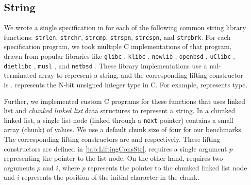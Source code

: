 

\subsection{String}
\label{sec:expstring}
We wrote a single specification in \SpecL{} for each of the following
common string library functions: {\tt strlen}, {\tt strchr}, {\tt strcmp}, {\tt strspn},
{\tt strcspn}, and {\tt strpbrk}.  For each specification
program, we took multiple C implementations of that program, drawn from popular
libraries like {\tt glibc} \cite{glibc}, {\tt klibc} \cite{klibc}, {\tt newlib} \cite{newlib},
{\tt openbsd} \cite{openbsdlibc}, {\tt uClibc} \cite{uclibc},
{\tt dietlibc} \cite{dietlibc}, {\tt musl} \cite{musl}, and {\tt netbsd} \cite{netbsd}.
These library implementations use a nul-terminated array to represent
a string, and the corresponding lifting constructor is .
 represents the N-bit unsigned integer type in C.
For example,  represents  type.

Further, we implemented custom C programs for these functions that uses linked list
and {\em chunked linked list} data structures to represent a string.
In a chunked linked list, a single list node (linked through a {\tt next} pointer)
contains a small array (chunk) of values.
We use a default chunk size of four for our benchmarks.
The corresponding lifting constructors are 
and  respectively.
These lifting constructors are defined in \cref{tab:LiftingConsStr}.
 requires a single
argument $p$ representing the pointer to the list node.
On the other hand,  requires two arguments $p$
and $i$, where $p$ represents the pointer to the chunked linked list node
and $i$ represents the position of the initial character in the chunk.



